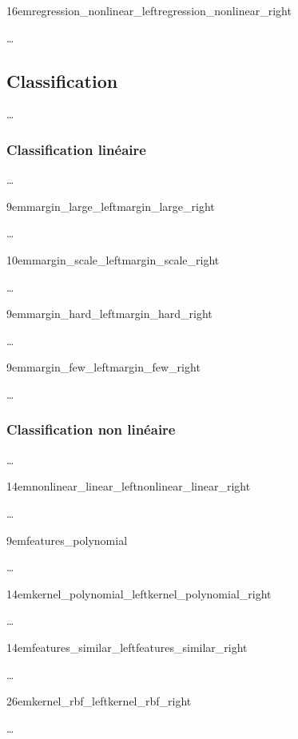 {16em}{regression_nonlinear_left}{regression_nonlinear_right}

…

\subsection{Classification}

…

\subsubsection{Classification linéaire}

…

{9em}{margin_large_left}{margin_large_right}

…

{10em}{margin_scale_left}{margin_scale_right}

…

{9em}{margin_hard_left}{margin_hard_right}

…

{9em}{margin_few_left}{margin_few_right}

…

\subsubsection{Classification non linéaire}

…

{14em}{nonlinear_linear_left}{nonlinear_linear_right}

…

{9em}{features_polynomial}

…

{14em}{kernel_polynomial_left}{kernel_polynomial_right}

…

{14em}{features_similar_left}{features_similar_right}

…

{26em}{kernel_rbf_left}{kernel_rbf_right}

…

\cite{svm}

\pagebreak
